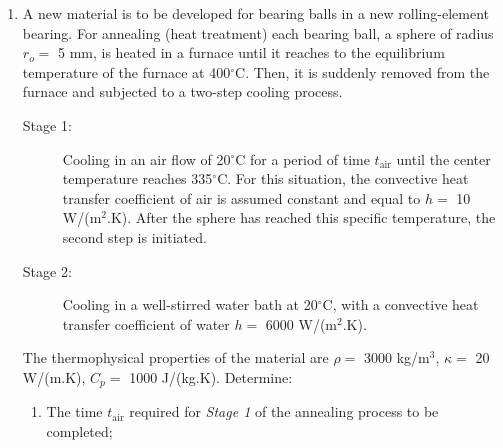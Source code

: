 \documentclass[calculator,datasheet,handbook,solutions]{exam}
\begin{document}
\pagebreak
  
\begin{question}

  \begin{enumerate}[1.]
    \item A new material is to be developed for bearing balls in a new rolling-element bearing. For annealing (heat treatment) each bearing ball, a sphere of radius $r_{o} =$ 5 mm, is heated in a furnace until it reaches to the equilibrium temperature of the furnace at 400$^{\circ}$C. Then, it is suddenly removed from the furnace and subjected to a two-step cooling process.
       \begin{description}
           \item[Stage 1:] Cooling in an air flow of 20$^{\circ}$C for a period of time $t_{\text{air}}$ until the center temperature reaches 335$^{\circ}$C. For this situation, the convective heat transfer coefficient of air is assumed constant and equal to $h =$ 10 W/(m$^{2}$.K). After the sphere has reached this specific temperature, the second step is initiated. 
           \item[Stage 2:] Cooling in a well-stirred water bath at 20$^{\circ}$C, with a convective heat transfer coefficient of water $h =$ 6000 W/(m$^{2}$.K). 
       \end{description}
       The thermophysical properties of the material are $\rho =$ 3000 kg/m$^{3}$, $\kappa =$ 20 W/(m.K), $C_{p} =$ 1000 J/(kg.K). Determine:
        \begin{enumerate}%
           \item The time $t_{\text{air}}$ required for {\it Stage 1} of the annealing process to be completed;
\end{enumerate}
\end{enumerate}
\end{question}
\end{document}
